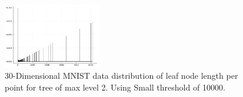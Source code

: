 \documentclass{juliacon}
\begin{document}
\begin{figure}[!ht]
  \centerline{
    \includegraphics[width=10pc]{figures/experiments/mnist_30/hist_3.png}
  }

  \caption{
    30-Dimensional MNIST data distribution of leaf node length per point for
    tree of max level 2. Using Small threshold of 10000.
  }
  \label{mnist-30-hist-th}
\end{figure}


\end{document}
